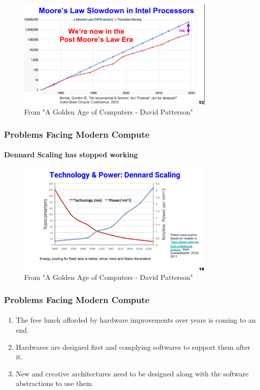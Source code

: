\documentclass{beamer}
\begin{document}
{\begin{frame}[fragile]
  \begin{figure}
    \centering
    \includegraphics[width=0.85\textwidth]{mooreslaw.png}
    \caption{From "A Golden Age of Computers - David Patterson"
    \cite{patterson19}}
  \end{figure}

\end{frame}

\begin{frame}[fragile]
\frametitle{Problems Facing Modern Compute}
  \framesubtitle{Dennard Scaling has stopped working}

  \begin{figure}
    \centering
    \includegraphics[width=0.85\textwidth]{dennardscaling.png}
    \caption{From "A Golden Age of Computers - David Patterson"}
  \end{figure}
\end{frame}

\begin{frame}[fragile]
\frametitle{Problems Facing Modern Compute}
  \framesubtitle{}
  \begin{enumerate}
    \item The free lunch afforded by hardware improvements over years
      is coming to an end.
    \item Hardwares are designed first and complying softwares to support
      them after it.
    \item New and creative architectures need to be designed along with the
      software abstractions to use them. 
  \end{enumerate}
\end{frame}


}
\end{document}
